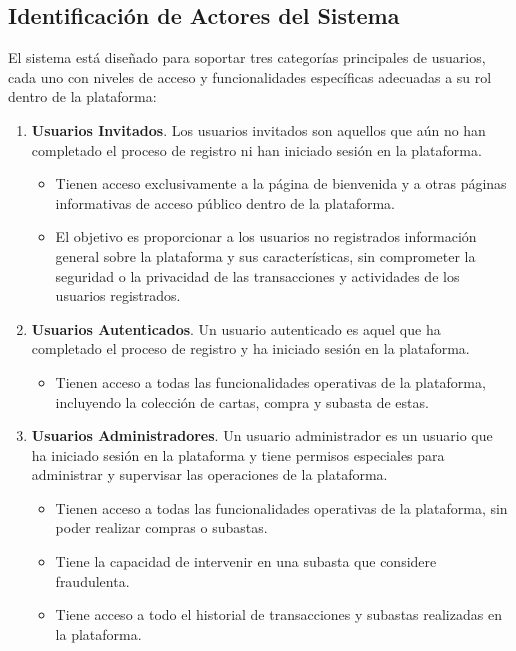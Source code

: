 \subsection{Identificación de Actores del Sistema} \label{sec:6_1-Identificacion_actores}
\hypertarget{sec:6_1-Identificacion_actores}{}

El sistema está diseñado para soportar tres categorías principales de usuarios, cada uno con niveles de acceso y funcionalidades específicas adecuadas a su rol dentro de la plataforma:
\begin{enumerate}
    \item \textbf{Usuarios Invitados}. 
    Los usuarios invitados son aquellos que aún no han completado el proceso de registro ni han iniciado sesión en la plataforma. 
    \begin{itemize}
        \item Tienen acceso exclusivamente a la página de bienvenida y a otras páginas informativas de acceso público dentro de la plataforma.
        \item El objetivo es proporcionar a los usuarios no registrados información general sobre la plataforma y sus características, sin comprometer la seguridad o la privacidad de las transacciones y actividades de los usuarios registrados.
   \end{itemize}
    
    \item \textbf{Usuarios Autenticados}.
    Un usuario autenticado es aquel que ha completado el proceso de registro y ha iniciado sesión en la plataforma.
    \begin{itemize}
        \item Tienen acceso a todas las funcionalidades operativas de la plataforma, incluyendo la colección de cartas, compra y subasta de estas.
    \end{itemize}
    
    \item \textbf{Usuarios Administradores}.
    Un usuario administrador es un usuario que ha iniciado sesión en la plataforma y tiene permisos especiales para administrar y supervisar las operaciones de la plataforma.
    \begin{itemize}
        \item Tienen acceso a todas las funcionalidades operativas de la plataforma, sin poder realizar compras o subastas.
        \item Tiene la capacidad de intervenir en una subasta que considere fraudulenta.
        \item Tiene acceso a todo el historial de transacciones y subastas realizadas en la plataforma.
    \end{itemize}
\end{enumerate}